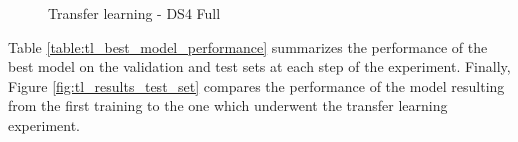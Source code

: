 \begin{figure}[H]
\centering
\noindent
{}
\caption{Transfer learning - DS4 Full}
\label{fig:tl_ds4_full}
\end{figure}

\noindent Table \ref{table:tl_best_model_performance} summarizes the performance of the best model on the validation and test sets at each step of the experiment. 
Finally, Figure \ref{fig:tl_results_test_set} compares the performance of the model resulting from the first training to the one which underwent the transfer learning experiment. 



